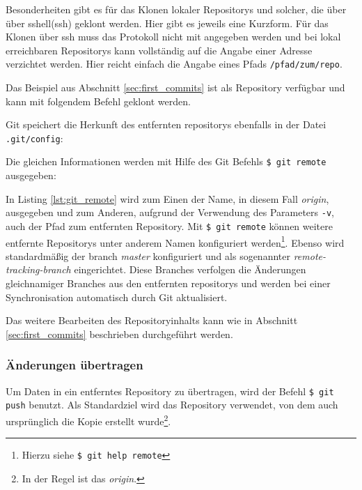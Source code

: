 
Besonderheiten gibt es für das Klonen lokaler Repositorys und solcher, die über
über \gls{sshell}(\acrshort{ssh}) geklont werden. Hier gibt es jeweils eine
Kurzform. Für das Klonen über \acrshort{ssh} muss das Protokoll nicht mit
angegeben werden und bei lokal erreichbaren Repositorys kann vollständig auf
die Angabe einer Adresse verzichtet werden. Hier reicht einfach die Angabe
eines Pfads \texttt{/pfad/zum/repo}.

Das Beispiel aus Abschnitt \ref{sec:first_commits} ist als
Repository verfügbar und kann mit folgendem Befehl geklont werden.


Git speichert die Herkunft des entfernten \glspl{repository} ebenfalls in der
Datei \texttt{.git/config}:


Die gleichen Informationen werden mit Hilfe des Git Befehls \texttt{\$ git
remote} ausgegeben:


In Listing \ref{lst:git_remote} wird zum Einen der Name, in diesem Fall
\textit{origin}, ausgegeben und zum Anderen, aufgrund der Verwendung des
Parameters \texttt{-v}, auch der Pfad zum entfernten Repository. Mit \texttt{\$
git remote} können weitere entfernte Repositorys unter anderem Namen
konfiguriert werden\footnote{Hierzu siehe \texttt{\$ git help remote}}. Ebenso
wird standardmäßig der \gls{branch} \textit{master} konfiguriert und als
sogenannter \textit{remote-tracking-branch} eingerichtet. Diese Branches verfolgen
die Änderungen gleichnamiger Branches aus den entfernten \glspl{repository}
und werden bei einer Synchronisation automatisch durch Git
aktualisiert. \cite[S.~141-143]{gitosp}

Das weitere Bearbeiten des Repositoryinhalts kann wie in Abschnitt
\ref{sec:first_commits} beschrieben durchgeführt werden.

\subsubsection{Änderungen übertragen}\label{sec:pushchanges}
Um Daten in ein entferntes Repository zu übertragen, wird der Befehl \texttt{\$
git push} benutzt. Als Standardziel wird das Repository verwendet, von dem auch
ursprünglich die Kopie erstellt wurde\footnote{In der Regel ist das \textit{origin}.}.

